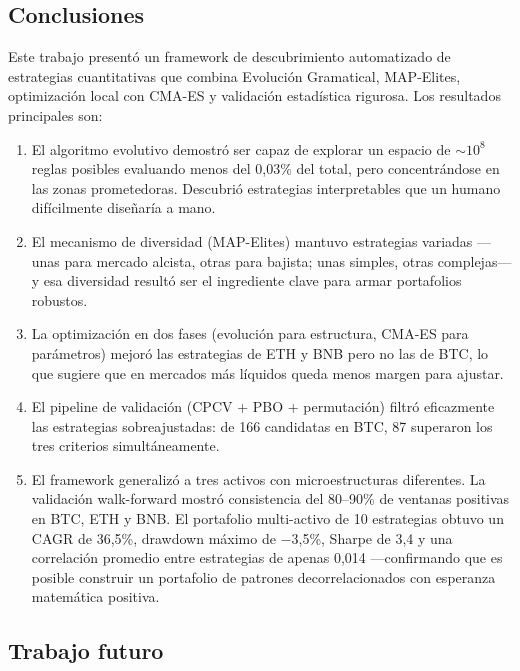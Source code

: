 \documentclass[12pt,a4paper]{article}
\begin{document}
\subsection{Conclusiones}

Este trabajo presentó un framework de descubrimiento automatizado de estrategias
cuantitativas que combina Evolución Gramatical, MAP-Elites, optimización local con
CMA-ES y validación estadística rigurosa. Los resultados principales son:

\begin{enumerate}
\item El algoritmo evolutivo demostró ser capaz de explorar un espacio de
  $\sim$$10^8$ reglas posibles evaluando menos del 0,03\% del total, pero
  concentrándose en las zonas prometedoras. Descubrió estrategias interpretables
  que un humano difícilmente diseñaría a mano.

\item El mecanismo de diversidad (MAP-Elites) mantuvo estrategias variadas ---unas
  para mercado alcista, otras para bajista; unas simples, otras complejas--- y esa
  diversidad resultó ser el ingrediente clave para armar portafolios robustos.

\item La optimización en dos fases (evolución para estructura, CMA-ES para
  parámetros) mejoró las estrategias de ETH y BNB pero no las de BTC, lo que
  sugiere que en mercados más líquidos queda menos margen para ajustar.

\item El pipeline de validación (CPCV + PBO + permutación) filtró eficazmente las
  estrategias sobreajustadas: de 166 candidatas en BTC, 87 superaron los tres
  criterios simultáneamente.

\item El framework generalizó a tres activos con microestructuras diferentes. La
  validación walk-forward mostró consistencia del 80--90\% de ventanas positivas
  en BTC, ETH y BNB. El portafolio multi-activo de 10 estrategias obtuvo un
  CAGR de 36,5\%, drawdown máximo de $-$3,5\%, Sharpe de 3,4 y una correlación
  promedio entre estrategias de apenas 0,014 ---confirmando que es posible construir
  un portafolio de patrones decorrelacionados con esperanza matemática positiva.
\end{enumerate}

\subsection{Trabajo futuro}
\end{document}
